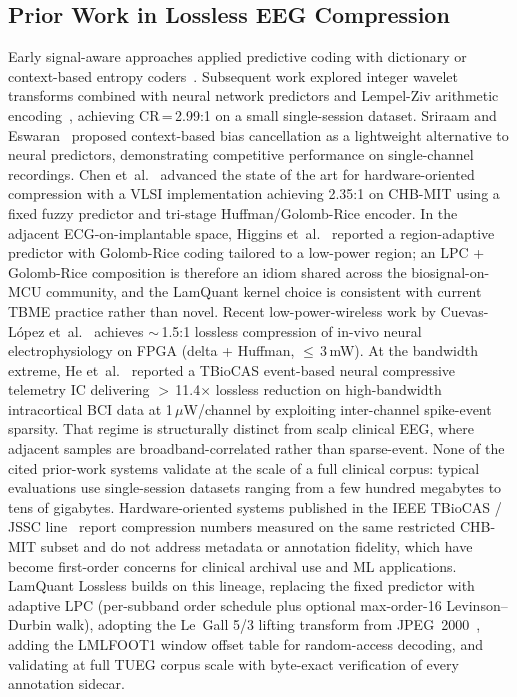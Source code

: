 \documentclass[journal]{IEEEtran}
\begin{document}
\subsection{Prior Work in Lossless EEG Compression}
Early signal-aware approaches applied predictive coding with
dictionary or context-based entropy coders~\cite{memon1998}.
Subsequent work explored integer wavelet transforms combined with
neural network predictors and Lempel-Ziv arithmetic
encoding~\cite{sriraam2012}, achieving CR\,=\,2.99:1 on a small
single-session dataset. Sriraam and Eswaran~\cite{sriraam2008}
proposed context-based bias cancellation as a lightweight alternative
to neural predictors, demonstrating competitive performance on
single-channel recordings.
Chen et~al.~\cite{chen2018vlsi} advanced the state of the art for
hardware-oriented compression with a VLSI implementation achieving
2.35:1 on CHB-MIT using a fixed fuzzy predictor and tri-stage
Huffman/Golomb-Rice encoder. In the adjacent ECG-on-implantable
space, Higgins et~al.~\cite{higgs2024ecg} reported a
region-adaptive predictor with Golomb-Rice coding tailored to a
low-power region; an LPC + Golomb-Rice composition is therefore
an idiom shared across the biosignal-on-MCU community, and the
LamQuant kernel choice is consistent with current TBME practice
rather than novel. Recent low-power-wireless work by
Cuevas-L{\'o}pez et~al.~\cite{cuevas2022wireless} achieves
$\sim$\,1.5:1 lossless compression of in-vivo neural
electrophysiology on FPGA (delta + Huffman, $\leq$\,3\,mW).
At the bandwidth extreme, He et~al.~\cite{he2024nct} reported a
TBioCAS event-based neural compressive telemetry IC delivering
$>$\,11.4{$\times$} lossless reduction on high-bandwidth
intracortical BCI data at 1\,$\mu$W/channel by exploiting
inter-channel spike-event sparsity. That regime is structurally
distinct from scalp clinical EEG, where adjacent samples are
broadband-correlated rather than sparse-event. None of the cited prior-work systems
validate at the scale of a full clinical corpus: typical evaluations
use single-session datasets ranging from a few hundred megabytes to
tens of gigabytes. Hardware-oriented systems published in the IEEE
TBioCAS / JSSC line~\cite{chen2018vlsi} report compression numbers
measured on the same restricted CHB-MIT subset and do not address
metadata or annotation fidelity, which have become first-order concerns
for clinical archival use and ML applications. LamQuant Lossless builds on this lineage,
replacing the fixed predictor with adaptive LPC (per-subband order
schedule plus optional max-order-16 Levinson--Durbin walk), adopting
the Le~Gall 5/3 lifting transform from JPEG~2000~\cite{sweldens1996,itu_t800},
adding the LMLFOOT1 window offset table for random-access decoding,
and validating at full TUEG corpus scale with byte-exact
verification of every annotation sidecar.
\end{document}
